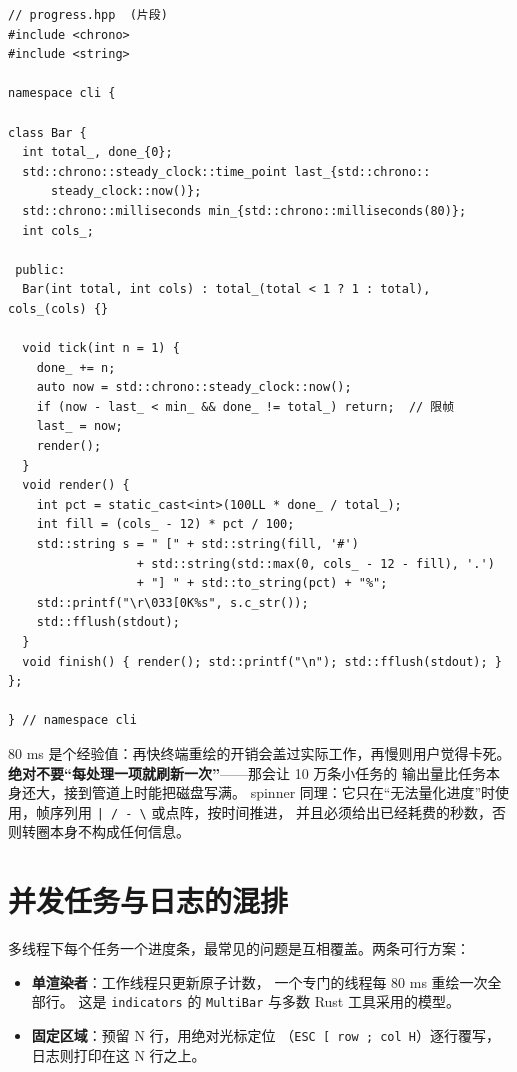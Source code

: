\documentclass[12pt,a4paper,fontset=fandol]{ctexbook}
\newcommand{\Tp}[1]{\texttt{#1}}
\begin{document}
\begin{lstlisting}[caption={时间驱动的单行进度}]
// progress.hpp  (片段)
#include <chrono>
#include <string>

namespace cli {

class Bar {
  int total_, done_{0};
  std::chrono::steady_clock::time_point last_{std::chrono::
      steady_clock::now()};
  std::chrono::milliseconds min_{std::chrono::milliseconds(80)};
  int cols_;

 public:
  Bar(int total, int cols) : total_(total < 1 ? 1 : total), cols_(cols) {}

  void tick(int n = 1) {
    done_ += n;
    auto now = std::chrono::steady_clock::now();
    if (now - last_ < min_ && done_ != total_) return;  // 限帧
    last_ = now;
    render();
  }
  void render() {
    int pct = static_cast<int>(100LL * done_ / total_);
    int fill = (cols_ - 12) * pct / 100;
    std::string s = " [" + std::string(fill, '#')
                  + std::string(std::max(0, cols_ - 12 - fill), '.')
                  + "] " + std::to_string(pct) + "%";
    std::printf("\r\033[0K%s", s.c_str());
    std::fflush(stdout);
  }
  void finish() { render(); std::printf("\n"); std::fflush(stdout); }
};

} // namespace cli
\end{lstlisting}

80 ms 是个经验值：再快终端重绘的开销会盖过实际工作，再慢则用户觉得卡死。
\textbf{绝对不要``每处理一项就刷新一次''}——那会让 10 万条小任务的
输出量比任务本身还大，接到管道上时能把磁盘写满。
spinner 同理：它只在``无法量化进度''时使用，帧序列用
\Tp{| / - \textbackslash{}} 或点阵，按时间推进，
并且必须给出已经耗费的秒数，否则转圈本身不构成任何信息。

\section{并发任务与日志的混排}

多线程下每个任务一个进度条，最常见的问题是互相覆盖。两条可行方案：

\begin{itemize}
\item \textbf{单渲染者}：工作线程只更新原子计数，
      一个专门的线程每 80 ms 重绘一次全部行。
      这是 \Tp{indicators} 的 \Tp{MultiBar} 与多数 Rust 工具采用的模型。
\item \textbf{固定区域}：预留 N 行，用绝对光标定位
      （\Tp{ESC [ row ; col H}）逐行覆写，日志则打印在这 N 行之上。
\end{itemize}
\end{document}

